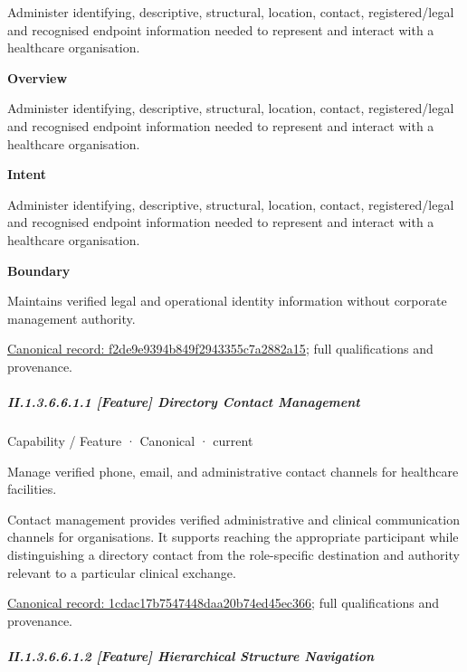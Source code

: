 Administer identifying, descriptive, structural, location, contact, registered/legal and recognised endpoint information needed to represent and interact with a healthcare organisation.



\textbf{Overview}



Administer identifying, descriptive, structural, location, contact, registered/legal and recognised endpoint information needed to represent and interact with a healthcare organisation.



\textbf{Intent}



Administer identifying, descriptive, structural, location, contact, registered/legal and recognised endpoint information needed to represent and interact with a healthcare organisation.



\textbf{Boundary}



Maintains verified legal and operational identity information without corporate management authority.


{\footnotesize \href{../../../../continuum/strategy/capability/f2de9e9394b849f2943355c7a2882a15.md}{Canonical record: f2de9e9394b849f2943355c7a2882a15}; full qualifications and provenance.}\par
\subparagraph*{II.1.3.6.6.1.1 [Feature] Directory Contact Management}
\label{navigation:II.1.3.6.6.1.1}

\label{element:1cdac17b7547448daa20b74ed45ec366}
{\small Capability / Feature · Canonical · current}\par

Manage verified phone, email, and administrative contact channels for healthcare facilities.



Contact management provides verified administrative and clinical communication channels for organisations. It supports reaching the appropriate participant while distinguishing a directory contact from the role-specific destination and authority relevant to a particular clinical exchange.


{\footnotesize \href{../../../../continuum/strategy/capability/feature/1cdac17b7547448daa20b74ed45ec366.md}{Canonical record: 1cdac17b7547448daa20b74ed45ec366}; full qualifications and provenance.}\par
\subparagraph*{II.1.3.6.6.1.2 [Feature] Hierarchical Structure Navigation}
\label{navigation:II.1.3.6.6.1.2}

